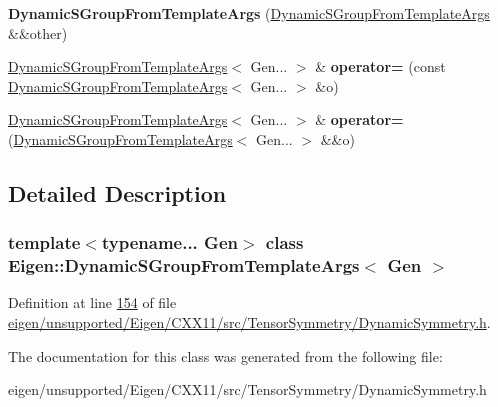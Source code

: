 \begin{DoxyCompactItemize}
{\bfseries Dynamic\+S\+Group\+From\+Template\+Args} (\hyperlink{class_eigen_1_1_dynamic_s_group_from_template_args}{Dynamic\+S\+Group\+From\+Template\+Args} \&\&other)
\item 
\mbox{\label{class_eigen_1_1_dynamic_s_group_from_template_args_aa7ce4dd875e679ac0514056a97e3d5cd}} 
\hyperlink{class_eigen_1_1_dynamic_s_group_from_template_args}{Dynamic\+S\+Group\+From\+Template\+Args}$<$ Gen... $>$ \& {\bfseries operator=} (const \hyperlink{class_eigen_1_1_dynamic_s_group_from_template_args}{Dynamic\+S\+Group\+From\+Template\+Args}$<$ Gen... $>$ \&o)
\item 
\mbox{\label{class_eigen_1_1_dynamic_s_group_from_template_args_a7e24a7db69be7147c3ebb57a4f389e39}} 
\hyperlink{class_eigen_1_1_dynamic_s_group_from_template_args}{Dynamic\+S\+Group\+From\+Template\+Args}$<$ Gen... $>$ \& {\bfseries operator=} (\hyperlink{class_eigen_1_1_dynamic_s_group_from_template_args}{Dynamic\+S\+Group\+From\+Template\+Args}$<$ Gen... $>$ \&\&o)
\end{DoxyCompactItemize}


\subsection{Detailed Description}
\subsubsection*{template$<$typename... Gen$>$\newline
class Eigen\+::\+Dynamic\+S\+Group\+From\+Template\+Args$<$ Gen $>$}



Definition at line \hyperlink{eigen_2unsupported_2_eigen_2_c_x_x11_2src_2_tensor_symmetry_2_dynamic_symmetry_8h_source_l00154}{154} of file \hyperlink{eigen_2unsupported_2_eigen_2_c_x_x11_2src_2_tensor_symmetry_2_dynamic_symmetry_8h_source}{eigen/unsupported/\+Eigen/\+C\+X\+X11/src/\+Tensor\+Symmetry/\+Dynamic\+Symmetry.\+h}.



The documentation for this class was generated from the following file\+:\begin{DoxyCompactItemize}
\item 
eigen/unsupported/\+Eigen/\+C\+X\+X11/src/\+Tensor\+Symmetry/\+Dynamic\+Symmetry.\+h\end{DoxyCompactItemize}
